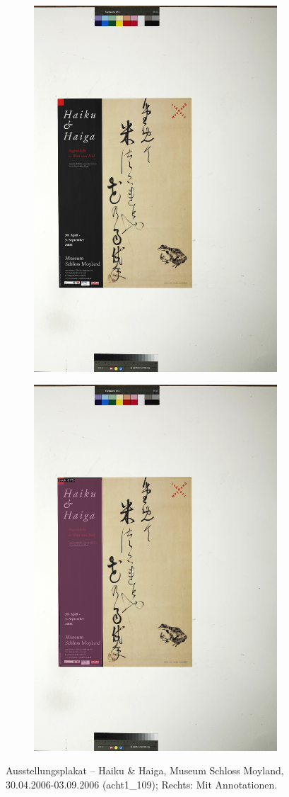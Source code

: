 \documentclass[a4paper,12pt,ngerman]{article}
\begin{document}
\newpage
\begin{landscape}
\begin{figure}[ht]
	\begin{subfigure}[b]{0.5\linewidth}
	\centering
	\includegraphics[height=\linewidth]{Abbildung_24_(acht1_109)}
	\end{subfigure}
	\begin{subfigure}[b]{0.5\linewidth}
	\centering
	\includegraphics[height=\linewidth]{Abbildung_24_(acht1_109)_with_detections}
	\end{subfigure}
	\caption{Ausstellungsplakat -- Haiku \& Haiga, Museum Schloss Moyland, 30.04.2006-03.09.2006 (acht1\_109); Rechts: Mit Annotationen.}
\end{figure}
\end{landscape}
\end{document}
